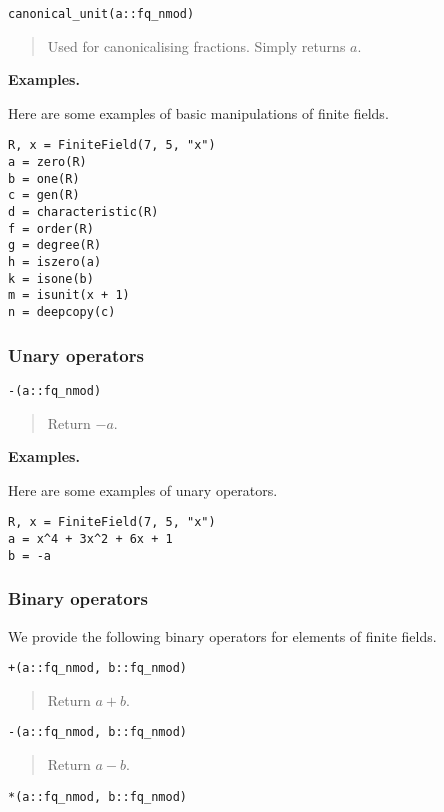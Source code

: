 \documentclass[a4paper,10pt]{article}
\newcommand{\desc}[1]{\vspace{-3mm}\begin{quote}#1\end{quote}}
\begin{document}
{{\begin{lstlisting}
canonical_unit(a::fq_nmod)
\end{lstlisting}

\desc{Used for canonicalising fractions. Simply returns $a$.}

\textbf{Examples.}

Here are some examples of basic manipulations of finite fields.

\begin{lstlisting}
R, x = FiniteField(7, 5, "x")
a = zero(R)
b = one(R)
c = gen(R)
d = characteristic(R)
f = order(R)
g = degree(R)
h = iszero(a)
k = isone(b)
m = isunit(x + 1)
n = deepcopy(c)
\end{lstlisting}

\subsubsection{Unary operators}

\begin{lstlisting}
-(a::fq_nmod)
\end{lstlisting}

\desc{Return $-a$.}

\textbf{Examples.}

Here are some examples of unary operators.

\begin{lstlisting}
R, x = FiniteField(7, 5, "x")
a = x^4 + 3x^2 + 6x + 1
b = -a
\end{lstlisting}

\subsubsection{Binary operators}

We provide the following binary operators for elements of
finite fields.

\begin{lstlisting}
+(a::fq_nmod, b::fq_nmod)
\end{lstlisting}

\desc{Return $a + b$.}

\begin{lstlisting}
-(a::fq_nmod, b::fq_nmod)
\end{lstlisting}

\desc{Return $a - b$.}

\begin{lstlisting}
*(a::fq_nmod, b::fq_nmod)
\end{lstlisting}

}}
\end{document}

